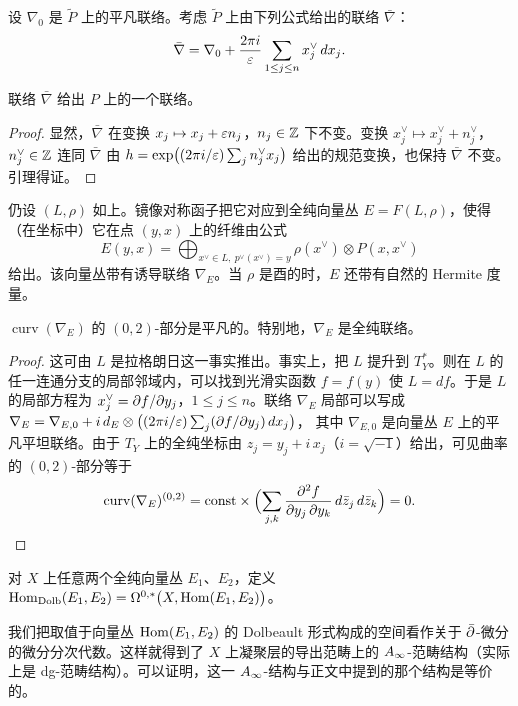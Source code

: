 设 $\nabla_0$ 是 $\tilde P$ 上的平凡联络。考虑 $\tilde P$ 上由下列公式给出的联络 $\bar\nabla$：
\[
\bar\nabla=\nabla_0+\frac{2\pi i}{\varepsilon}\sum_{1\le j\le n}x_j^{\vee}\,dx_j.
\]

\begin{lmm}
联络 $\bar\nabla$ 给出 $P$ 上的一个联络。
\end{lmm}

\begin{proof}
显然，$\bar\nabla$ 在变换 $x_j\mapsto x_j+\varepsilon n_j$，$n_j\in\mathbb{Z}$ 下不变。变换 $x_j^{\vee}\mapsto x_j^{\vee}+n_j^{\vee}$，$n_j^{\vee}\in\mathbb{Z}$ 连同 $\bar\nabla$ 由 $h=\exp\bigl((2\pi i/\varepsilon)\sum_j n_j^{\vee}x_j\bigr)$ 给出的规范变换，也保持 $\bar\nabla$ 不变。引理得证。
\end{proof}

仍设 $(L,\rho)$ 如上。镜像对称函子把它对应到全纯向量丛 $E=F(L,\rho)$，使得（在坐标中）它在点 $(y,x)$ 上的纤维由公式
\[
E(y,x)=\bigoplus_{x^{\vee}\in L,\ p^{\vee}(x^{\vee})=y}\rho(x^{\vee})\otimes P(x,x^{\vee})
\]
给出。该向量丛带有诱导联络 $\nabla_E$。当 $\rho$ 是酉的时，$E$ 还带有自然的 Hermite 度量。

\begin{prp}
$\operatorname{curv}(\nabla_E)$ 的 $(0,2)$-部分是平凡的。特别地，$\nabla_E$ 是全纯联络。
\end{prp}

\begin{proof}
这可由 $L$ 是拉格朗日这一事实推出。事实上，把 $L$ 提升到 $T^{*}_Y$。则在 $L$ 的任一连通分支的局部邻域内，可以找到光滑实函数 $f=f(y)$ 使 $L=df$。于是 $L$ 的局部方程为 $x_j^{\vee}=\partial f/\partial y_j$，$1\le j\le n$。联络 $\nabla_E$ 局部可以写成
$\nabla_E=\nabla_{E,0}+i\,d_E\otimes\bigl((2\pi i/\varepsilon)\sum_j (\partial f/\partial y_j)\,dx_j\bigr)$，
其中 $\nabla_{E,0}$ 是向量丛 $E$ 上的平凡平坦联络。由于 $T_Y$ 上的全纯坐标由 $z_j=y_j+i\,x_j$（$i=\sqrt{-1}$）给出，可见曲率的 $(0,2)$-部分等于
\[
\operatorname{curv}(\nabla_E)^{(0,2)}=\text{const}\times\Bigl(\sum_{j,k}\frac{\partial^2 f}{\partial y_j\,\partial y_k}\,d\bar z_j\,d\bar z_k\Bigr)=0 .\qedhere
\]
\end{proof}

\begin{dfn}
对 $X$ 上任意两个全纯向量丛 $E_1$、$E_2$，定义
$\operatorname{Hom}_{\mathrm{Dolb}}(E_1,E_2)=\Omega^{0,*}\bigl(X,\operatorname{Hom}(E_1,E_2)\bigr)$。
\end{dfn}

我们把取值于向量丛 $\operatorname{Hom}(E_1,E_2)$ 的 Dolbeault 形式构成的空间看作关于 $\bar\partial$-微分的微分分次代数。这样就得到了 $X$ 上凝聚层的导出范畴上的 $A_{\infty}$-范畴结构（实际上是 dg-范畴结构）。可以证明，这一 $A_{\infty}$-结构与正文中提到的那个结构是等价的。

